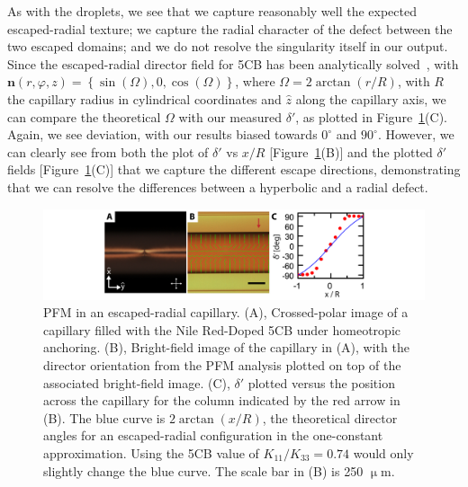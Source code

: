 As with the droplets, we see that we capture reasonably well the expected escaped-radial texture; we capture the radial character of the defect between the two escaped domains; and we do not resolve the singularity itself in our output.
Since the escaped-radial director field for 5CB has been analytically solved~\cite{RN289,RN290}, with $\mathbf{n}(r,\varphi,z) = \left \{ \sin(\Omega), 0, \cos(\Omega)   \right \}$, where $\Omega = 2 \arctan(r/R) $, with $R$ the capillary radius in cylindrical coordinates and $\hat{z}$ along the capillary axis, we can compare the theoretical $\Omega$ with our measured $\delta'$, as plotted in Figure~\ref{f:5-PFM_Capillary}(C).
Again, we see deviation, with our results biased towards $0^{\circ}$ and $90^{\circ}$.
However, we can clearly see from both the plot of $\delta'$ vs $x/R$ [Figure~\ref{f:5-PFM_Capillary}(B)] and the plotted $\delta'$ fields [Figure~\ref{f:5-PFM_Capillary}(C)] that we capture the different escape directions, demonstrating that we can resolve the differences between a hyperbolic and a radial defect.
\begin{figure}
  \centering
  \includegraphics{figures/C5/Ch5-Figs_PFM_Capillary.png}
  \caption{PFM in an escaped-radial capillary.
  (A), Crossed-polar image of a capillary filled with the Nile Red-Doped 5CB under homeotropic anchoring.
  (B), Bright-field image of the capillary in (A), with the director orientation from the PFM analysis plotted on top of the associated bright-field image.
  (C), $\delta'$ plotted versus the position across the capillary for the column indicated by the red arrow in (B).
  The blue curve is $2 \arctan (x/R)$, the theoretical director angles for an escaped-radial configuration in the one-constant approximation.
  Using the 5CB value of $K_{11}/K_{33} = 0.74$ would only slightly change the blue curve.
  The scale bar in (B) is 250 $\upmu$m.}\label{f:5-PFM_Capillary}
\end{figure}

